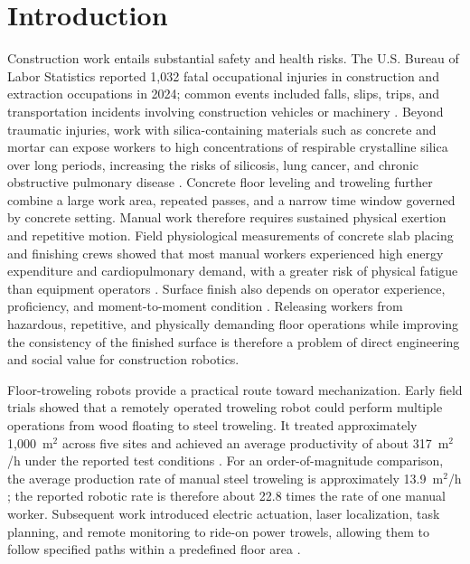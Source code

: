 \section{Introduction}

Construction work entails substantial safety and health risks. The U.S. Bureau of Labor Statistics reported 1,032 fatal occupational injuries in construction and extraction occupations in 2024; common events included falls, slips, trips, and transportation incidents involving construction vehicles or machinery \cite{bls2024}. Beyond traumatic injuries, work with silica-containing materials such as concrete and mortar can expose workers to high concentrations of respirable crystalline silica over long periods, increasing the risks of silicosis, lung cancer, and chronic obstructive pulmonary disease \cite{niosh2024}. Concrete floor leveling and troweling further combine a large work area, repeated passes, and a narrow time window governed by concrete setting. Manual work therefore requires sustained physical exertion and repetitive motion. Field physiological measurements of concrete slab placing and finishing crews showed that most manual workers experienced high energy expenditure and cardiopulmonary demand, with a greater risk of physical fatigue than equipment operators \cite{abdelhamid1999}. Surface finish also depends on operator experience, proficiency, and moment-to-moment condition \cite{albers2004,kobayashi1996}. Releasing workers from hazardous, repetitive, and physically demanding floor operations while improving the consistency of the finished surface is therefore a problem of direct engineering and social value for construction robotics.

Floor-troweling robots provide a practical route toward mechanization. Early field trials showed that a remotely operated troweling robot could perform multiple operations from wood floating to steel troweling. It treated approximately 1,000~m$^2$ across five sites and achieved an average productivity of about 317~m$^2$/h under the reported test conditions \cite{kobayashi1996}. For an order-of-magnitude comparison, the average production rate of manual steel troweling is approximately 13.9~m$^2$/h \cite{methvin2026}; the reported robotic rate is therefore about 22.8 times the rate of one manual worker. Subsequent work introduced electric actuation, laser localization, task planning, and remote monitoring to ride-on power trowels, allowing them to follow specified paths within a predefined floor area \cite{hwangbo1999}.

